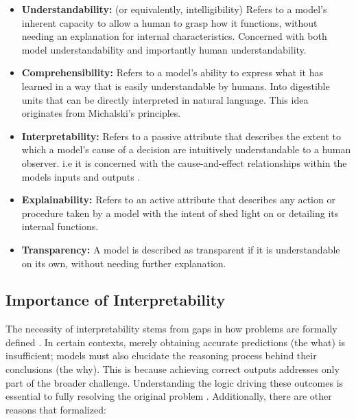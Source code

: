 \begin{itemize}
    \item \textbf{Understandability:} (or equivalently, intelligibility) Refers to a model’s inherent capacity to allow a human to grasp how it functions, without needing an explanation for internal characteristics. Concerned with both model understandability and importantly human understandability.

    \item \textbf{Comprehensibility:} Refers to a model’s ability to express what it has learned in a way that is easily understandable by humans. Into digestible units that can be directly interpreted in natural language. This idea originates from Michalski’s principles.

    \item \textbf{Interpretability:} Refers to a passive attribute that describes the extent to which a model's cause of a decision are intuitively understandable to a human observer. i.e it is concerned with the cause-and-effect relationships within the models inputs and outputs \citep{linardatos2020explainable}.
    
    \item \textbf{Explainability:} Refers to an active attribute that describes any action or procedure taken by a model with the intent of shed light on or detailing its internal functions.
    
    \item \textbf{Transparency:} A model is described as transparent if it is understandable on its own, without needing further explanation. 
\end{itemize}

\subsection{Importance of Interpretability}
The necessity of interpretability stems from gaps in how problems are formally defined \citep{doshi2017towards}. In certain contexts, merely obtaining accurate predictions (the what) is insufficient; models must also elucidate the reasoning process behind their conclusions (the why). This is because achieving correct outputs addresses only part of the broader challenge. Understanding the logic driving these outcomes is essential to fully resolving the original problem \citep{molnar2020interpretable}. Additionally, there are other reasons that \citet{molnar2020interpretable} formalized:


